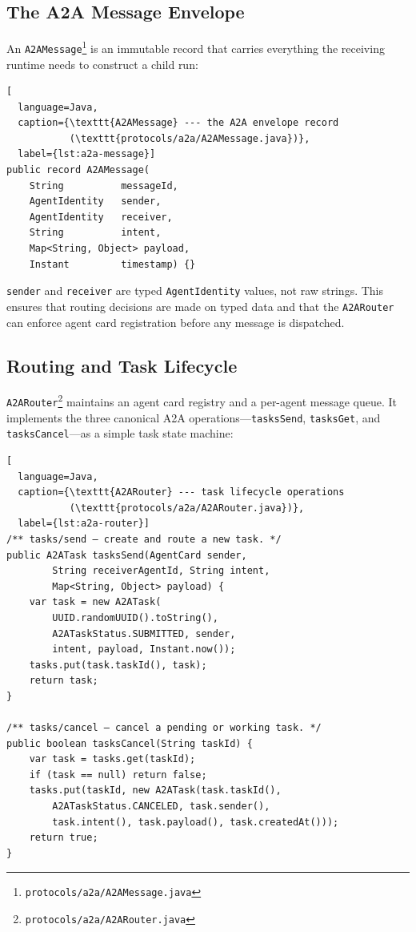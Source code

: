 \subsection{The A2A Message Envelope}
\label{subsec:a2a-envelope}

An \lstinline{A2AMessage}\footnote{\texttt{protocols/a2a/A2AMessage.java}}
is an immutable record that carries everything the receiving runtime
needs to construct a child run:

\begin{lstlisting}[
  language=Java,
  caption={\texttt{A2AMessage} --- the A2A envelope record
           (\texttt{protocols/a2a/A2AMessage.java})},
  label={lst:a2a-message}]
public record A2AMessage(
    String          messageId,
    AgentIdentity   sender,
    AgentIdentity   receiver,
    String          intent,
    Map<String, Object> payload,
    Instant         timestamp) {}
\end{lstlisting}

\lstinline{sender} and \lstinline{receiver} are typed
\lstinline{AgentIdentity} values, not raw strings.  This ensures
that routing decisions are made on typed data and that the
\lstinline{A2ARouter} can enforce agent card registration before
any message is dispatched.

\subsection{Routing and Task Lifecycle}
\label{subsec:a2a-routing}

\lstinline{A2ARouter}\footnote{\texttt{protocols/a2a/A2ARouter.java}}
maintains an agent card registry and a per-agent message queue.
It implements the three canonical A2A operations---\lstinline{tasksSend},
\lstinline{tasksGet}, and \lstinline{tasksCancel}---as a simple
task state machine:

\begin{lstlisting}[
  language=Java,
  caption={\texttt{A2ARouter} --- task lifecycle operations
           (\texttt{protocols/a2a/A2ARouter.java})},
  label={lst:a2a-router}]
/** tasks/send — create and route a new task. */
public A2ATask tasksSend(AgentCard sender,
        String receiverAgentId, String intent,
        Map<String, Object> payload) {
    var task = new A2ATask(
        UUID.randomUUID().toString(),
        A2ATaskStatus.SUBMITTED, sender,
        intent, payload, Instant.now());
    tasks.put(task.taskId(), task);
    return task;
}

/** tasks/cancel — cancel a pending or working task. */
public boolean tasksCancel(String taskId) {
    var task = tasks.get(taskId);
    if (task == null) return false;
    tasks.put(taskId, new A2ATask(task.taskId(),
        A2ATaskStatus.CANCELED, task.sender(),
        task.intent(), task.payload(), task.createdAt()));
    return true;
}
\end{lstlisting}


